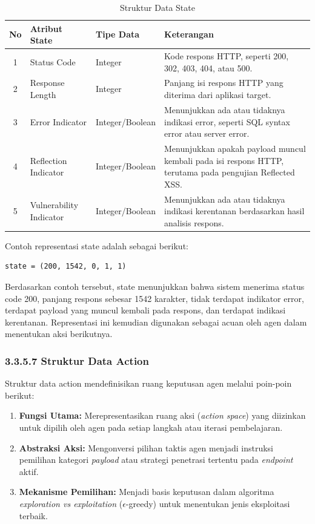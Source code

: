 \begin{table}[H]
\centering
\begin{tabular}{|c|l|l|p{6.5cm}|}
\hline
\textbf{No} & \textbf{Atribut State} & \textbf{Tipe Data} & \textbf{Keterangan} \\ \hline

1 & Status Code & Integer & Kode respons HTTP, seperti 200, 302, 403, 404, atau 500. \\ \hline
2 & Response Length & Integer & Panjang isi respons HTTP yang diterima dari aplikasi target. \\ \hline
3 & Error Indicator & Integer/Boolean & Menunjukkan ada atau tidaknya indikasi error, seperti SQL syntax error atau server error. \\ \hline
4 & Reflection Indicator & Integer/Boolean & Menunjukkan apakah payload muncul kembali pada isi respons HTTP, terutama pada pengujian Reflected XSS. \\ \hline
5 & Vulnerability Indicator & Integer/Boolean & Menunjukkan ada atau tidaknya indikasi kerentanan berdasarkan hasil analisis respons. \\ \hline

\end{tabular}
\caption{Struktur Data State}
\label{tab:struktur_state}
\end{table}

Contoh representasi state adalah sebagai berikut:

\begin{verbatim}
state = (200, 1542, 0, 1, 1)
\end{verbatim}

Berdasarkan contoh tersebut, state menunjukkan bahwa sistem menerima status code 200, panjang respons sebesar 1542 karakter, tidak terdapat indikator error, terdapat payload yang muncul kembali pada respons, dan terdapat indikasi kerentanan. Representasi ini kemudian digunakan sebagai acuan oleh agen dalam menentukan aksi berikutnya.

\subsubsection{3.3.5.7 Struktur Data Action}

Struktur data action mendefinisikan ruang keputusan agen melalui poin-poin berikut:

\begin{enumerate}
    \item \textbf{Fungsi Utama:} Merepresentasikan ruang aksi (\textit{action space}) yang diizinkan untuk dipilih oleh agen pada setiap langkah atau iterasi pembelajaran.
    \item \textbf{Abstraksi Aksi:} Mengonversi pilihan taktis agen menjadi instruksi pemilihan kategori \textit{payload} atau strategi penetrasi tertentu pada \textit{endpoint} aktif.
    \item \textbf{Mekanisme Pemilihan:} Menjadi basis keputusan dalam algoritma \textit{exploration vs exploitation} ($\epsilon$-greedy) untuk menentukan jenis eksploitasi terbaik.
\end{enumerate}

